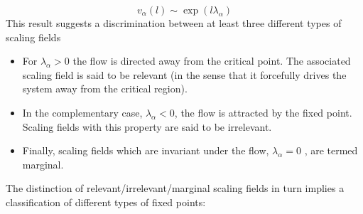 \documentclass[cyan]{elegantnote}
\begin{document}
\[v_{\alpha}(l) \sim \exp(l\lambda_{\alpha})\]
This result suggests a discrimination between at least three different types of scaling fields
\begin{itemize}
\item For $\lambda_{\alpha} > 0$ the flow is directed away from the critical point. The associated scaling field
is said to be relevant (in the sense that it forcefully drives the system away from the critical region).
\item In the complementary case, $\lambda_{\alpha} < 0$, the flow is attracted by the fixed point. Scaling fields
with this property are said to be irrelevant.
\item Finally, scaling fields which are invariant under the flow, $\lambda_{\alpha} = 0$ , are termed marginal.
\end{itemize}
The distinction of relevant/irrelevant/marginal scaling fields in turn implies a classification of different types of fixed points:
\end{document}
